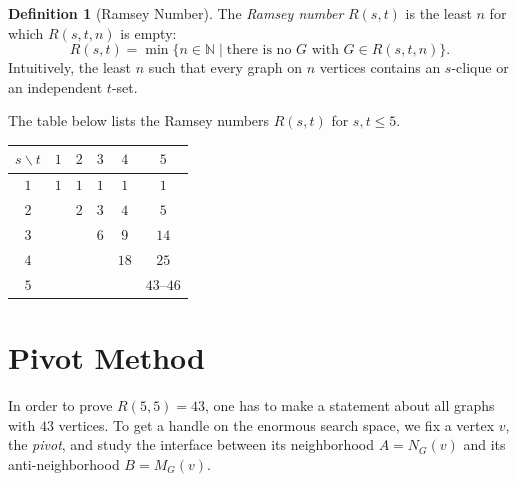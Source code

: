 \documentclass[a4paper]{article}
\theoremstyle{definition}
\newtheorem{definition}{Definition}
\begin{document}
\begin{definition}[Ramsey Number]
	The \emph{Ramsey number} $R(s,t)$ is the least $n$ for which $R(s,t,n)$
	is empty:
	\[
		R(s,t) = \min \bigl\{ n \in \mathbb{N} \mid
		\text{there is no } G \text{ with } G \in R(s,t,n) \bigr\}.
	\]
	Intuitively, the least $n$ such that every graph on $n$ vertices
	contains an $s$-clique or an independent $t$-set.
\end{definition}


The table below lists the Ramsey numbers $R(s,t)$ for $s, t \le 5$.

\begin{center}
	\begin{tabular}{c|ccccc}
		\hline
		$s \backslash t$ & $1$ & $2$ & $3$ & $4$  & $5$        \\
		\hline
		$1$              & $1$ & $1$ & $1$ & $1$  & $1$        \\
		$2$              &     & $2$ & $3$ & $4$  & $5$        \\
		$3$              &     &     & $6$ & $9$  & $14$       \\
		$4$              &     &     &     & $18$ & $25$       \\
		$5$              &     &     &     &      & $43$--$46$ \\
		\hline
	\end{tabular}
\end{center}


\newpage
\section{Pivot Method}

In order to prove $R(5,5) = 43$, one has to make a statement about all graphs with $43$ vertices.
To get a handle on the enormous search space, we fix a vertex $v$, the \emph{pivot},
and study the interface between its neighborhood $A = N_G(v)$ and its anti-neighborhood $B = M_G(v)$.


\end{document}
